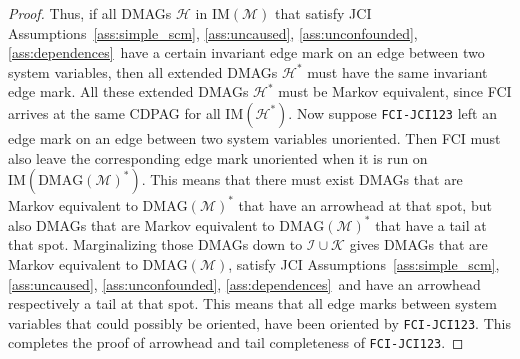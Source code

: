 \documentclass[twoside,11pt]{article}
\newcommand\C[1]{\mathcal{#1}}
\newcommand{\DMAG}{\mathrm{DMAG}}
\newcommand{\IM}{\mathrm{IM}}
\newcommand{\alg}[1]{\texttt{#1}}
\newcommand{\JCIABC}{\ref{ass:uncaused}, \ref{ass:unconfounded}, \ref{ass:dependences}}
\begin{document}
\begin{proof}
  Thus, if all DMAGs $\C{H}$ in $\IM(\C{M})$ that satisfy JCI Assumptions~\ref{ass:simple_scm}, \JCIABC\ have a certain invariant edge mark on an 
  edge between two system variables, then all extended DMAGs $\C{H}^*$ must have the same invariant edge mark. All these extended
  DMAGs $\C{H}^*$ must be Markov equivalent, since FCI arrives at the same CDPAG for all $\IM(\C{H}^*)$.
  Now suppose \alg{FCI-JCI123} left an edge mark on an edge between two system variables unoriented. Then FCI must also
  leave the corresponding edge mark unoriented when it is run on $\IM(\DMAG(\C{M})^*)$. This means that there must exist DMAGs that 
  are Markov equivalent to $\DMAG(\C{M})^*$ that have an arrowhead at that spot, but also DMAGs that are Markov equivalent to 
  $\DMAG(\C{M})^*$ that have a tail at that spot. Marginalizing those DMAGs down to $\C{I} \cup \C{K}$ gives DMAGs that are
  Markov equivalent to $\DMAG(\C{M})$, satisfy JCI Assumptions~\ref{ass:simple_scm}, \JCIABC\, and have an arrowhead respectively a tail at that spot. 
  This means that all edge marks between system variables that could possibly be oriented, have been oriented by \alg{FCI-JCI123}.
  This completes the proof of arrowhead and tail completeness of \alg{FCI-JCI123}.

\end{proof}
\end{document}
